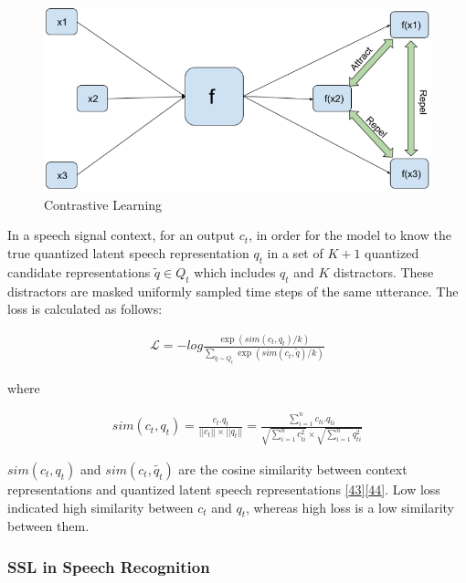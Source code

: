 \documentclass[
  a4paper,
]{article}
\begin{document}
\begin{figure}

{\centering \includegraphics{cl} 

}

\caption{Contrastive Learning}\label{fig:cl}
\end{figure}

In a speech signal context, for an output \(c_t\), in order for the
model to know the true quantized latent speech representation \(q_t\) in
a set of \(K +1\) quantized candidate representations
\(\tilde{q} \in Q_t\) which includes \(q_t\) and \(K\) distractors.
These distractors are masked uniformly sampled time steps of the same
utterance. The loss is calculated as follows:

\begin{align}
\mathcal{L} = -log \frac{\exp(sim(c_t, q_t)/ k)}{\sum_{\tilde{q}\sim{Q_t}} \exp(sim(c_t, \tilde{q})/ k)}
\end{align}

\noindent where

\begin{align}
sim(c_t, q_t) = \frac{c_t . q_t}{||c_t|| \times ||q_t||} = \frac{\sum_{i=1}^n{c_{ti} . q_{ti}}}{\sqrt{\sum_{i=1}^n{c_{ti}^2}} \times \sqrt{\sum_{i=1}^n q_{ti}^2}}
\end{align}

\noindent \(sim(c_t, q_t)\) and \(sim(c_t, \tilde{q_t})\) are the cosine
similarity between context representations and quantized latent speech
representations
\protect\hyperlink{ref-he2020momentum}{{[}43{]}}\protect\hyperlink{ref-chen2020simple}{{[}44{]}}.
Low loss indicated high similarity between \(c_t\) and \(q_t\), whereas
high loss is a low similarity between them.

\hypertarget{ssl-in-speech-recognition}{%
\subsubsection{SSL in Speech
Recognition}\label{ssl-in-speech-recognition}}
\end{document}
